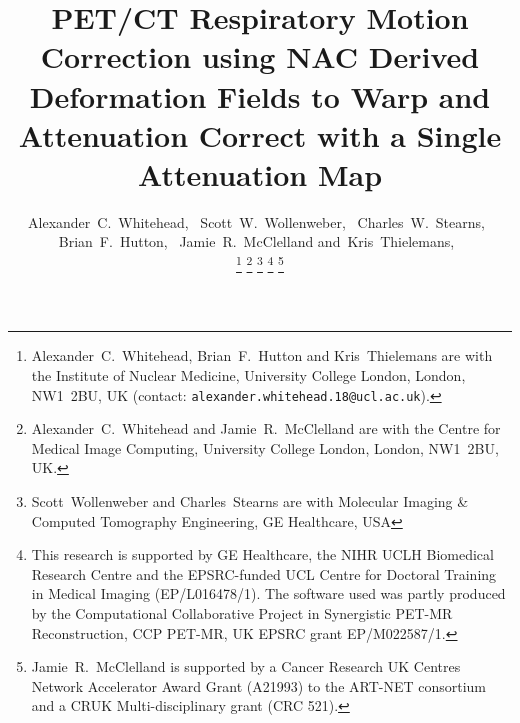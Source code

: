 \documentclass[10pt, twocolumn, twoside, letterpaper]{IEEEtran}
\begin{document}
\title{PET/CT Respiratory Motion Correction using NAC Derived Deformation Fields to Warp and Attenuation Correct with a Single Attenuation Map}

\pagestyle{plain}

\author{Alexander~C.~Whitehead,~
        Scott~W.~Wollenweber,~
        Charles~W.~Stearns,~
        Brian~F.~Hutton,~
        Jamie~R.~McClelland
        and~Kris~Thielemans,~%

    \thanks{Alexander~C.~Whitehead, Brian~F.~Hutton and Kris~Thielemans are with the Institute of Nuclear Medicine, University College London, London, NW1~2BU, UK (contact: \texttt{alexander.whitehead.18@ucl.ac.uk}).}%
    \thanks{Alexander~C.~Whitehead and Jamie~R.~McClelland are with the Centre for Medical Image Computing, University College London, London, NW1~2BU, UK.}%
    \thanks{Scott~Wollenweber and Charles~Stearns are with Molecular Imaging \& Computed Tomography Engineering, GE Healthcare, USA}%
    \thanks{This research is supported by GE Healthcare, the NIHR UCLH Biomedical Research Centre and the EPSRC-funded UCL Centre for Doctoral Training in Medical Imaging (EP/L016478/1). The software used was partly produced by the Computational Collaborative Project in Synergistic PET-MR Reconstruction, CCP PET-MR, UK EPSRC grant EP/M022587/1.}%
    \thanks{Jamie~R.~McClelland is supported by a Cancer Research UK Centres Network Accelerator Award Grant (A21993) to the ART-NET consortium and a CRUK Multi-disciplinary grant (CRC 521).}%
}

\maketitle
\IEEEpeerreviewmaketitle
\end{document}
